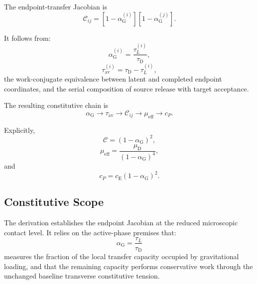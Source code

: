 The endpoint-transfer Jacobian is
\begin{equation}
    \boxed{ \mathcal{C}_{ij} = \left[ 1-\alpha_{\mathrm{G}}^{(i)} \right] \left[ 1-\alpha_{\mathrm{G}}^{(j)} \right] }.
\end{equation}

It follows from:
\begin{equation}
    \alpha_{\mathrm{G}}^{(i)} = \frac{\tau_L^{(i)}}{\tau_{\mathrm{D}}},
\end{equation}
\begin{equation}
    \tau_{\mathrm{av}}^{(i)} = \tau_{\mathrm{D}} - \tau_L^{(i)},
\end{equation}
the work-conjugate equivalence between latent and completed endpoint coordinates, and the serial composition of source release with target acceptance.

The resulting constitutive chain is
\begin{equation}
    \boxed{ \alpha_{\mathrm{G}} \longrightarrow \tau_{\mathrm{av}} \longrightarrow \mathcal{C}_{ij} \longrightarrow \mu_{\mathrm{eff}} \longrightarrow c_P }.
\end{equation}

Explicitly,
\begin{equation}
    \boxed{ \mathcal{C} = \left( 1-\alpha_{\mathrm{G}} \right)^2 },
\end{equation}
\begin{equation}
    \boxed{ \mu_{\mathrm{eff}} = \frac{\mu_{\mathrm{D}}}{ \left( 1-\alpha_{\mathrm{G}} \right)^4 } },
\end{equation}
and
\begin{equation}
    \boxed{ c_P = c_{\mathrm{E}} \left( 1-\alpha_{\mathrm{G}} \right)^2 }.
\end{equation}

\subsection{Constitutive Scope}

The derivation establishes the endpoint Jacobian at the reduced microscopic contact level. It relies on the active-phase premises that:
\begin{equation}
    \alpha_{\mathrm{G}} = \frac{\tau_L}{\tau_{\mathrm{D}}}
\end{equation}
measures the fraction of the local transfer capacity occupied by gravitational loading, and that the remaining capacity performs conservative work through the unchanged baseline transverse constitutive tension.

